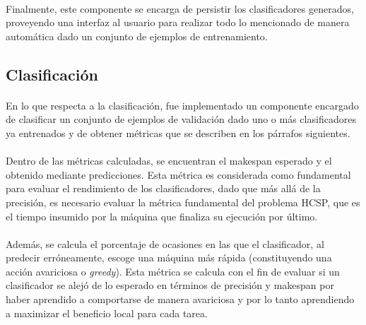 \paragraph{} Finalmente, este componente se encarga de persistir los clasificadores generados, proveyendo una interfaz al usuario para realizar todo lo mencionado de manera automática dado un conjunto de ejemplos de entrenamiento.

\subsection{Clasificación}

\paragraph{} En lo que respecta a la clasificación, fue implementado un componente encargado de clasificar un conjunto de ejemplos de validación dado uno o más clasificadores ya entrenados y de obtener métricas que se describen en los párrafos siguientes.

\paragraph{} Dentro de las métricas calculadas, se encuentran el makespan esperado y el obtenido mediante predicciones. Esta métrica es considerada como fundamental para evaluar el rendimiento de los clasificadores, dado que más allá de la precisión, es necesario evaluar la métrica fundamental del problema HCSP, que es el tiempo insumido por la máquina que finaliza su ejecución por último.

\paragraph{} Además, se calcula el porcentaje de ocasiones en las que el clasificador, al predecir erróneamente, escoge una máquina más rápida (constituyendo una acción avariciosa o \textit{greedy}). Esta métrica se calcula con el fin de evaluar si un clasificador se alejó de lo esperado en términos de precisión y makespan por haber aprendido a comportarse de manera avariciosa y por lo tanto aprendiendo a maximizar el beneficio local para cada tarea.


